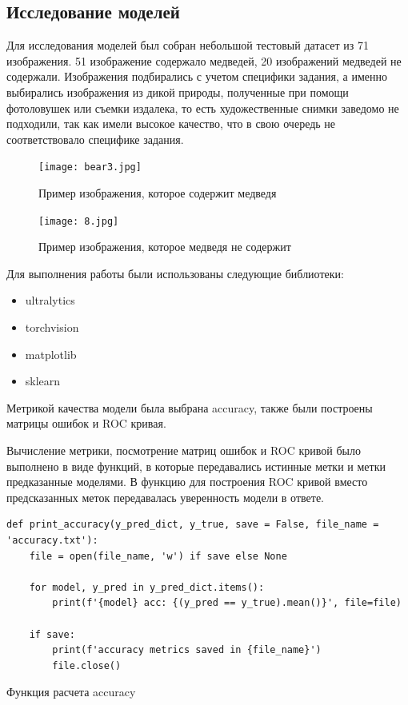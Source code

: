 \documentclass[../document.tex]{subfiles}
\begin{document}
 	\subsection{Исследование моделей}
 		\par Для исследования моделей был собран небольшой тестовый датасет из 71 изображения. 51 изображение содержало медведей, 20 изображений медведей не содержали. Изображения подбирались с учетом специфики задания, а именно выбирались изображения из дикой природы, полученные при помощи фотоловушек или съемки издалека, то есть художественные снимки заведомо не подходили, так как имели высокое качество, что в свою очередь не соответствовало специфике задания.
 		\begin{figure}[H]
 			\centering
 			\texttt{[image: bear3.jpg]}
 			\caption{Пример изображения, которое содержит медведя}
 		\end{figure}
 		\begin{figure}[H]
 			\centering
 			\texttt{[image: 8.jpg]}
 			\caption{Пример изображения, которое медведя не содержит}
 		\end{figure}
 		\par Для выполнения работы были использованы следующие библиотеки:
 		\begin{itemize}
 			\item ultralytics
 			\item torchvision
 			\item matplotlib
 			\item sklearn
 		\end{itemize}
 		\par Метрикой качества модели была выбрана accuracy, также были построены матрицы ошибок и ROC кривая.
 		\par Вычисление метрики, посмотрение матриц ошибок и ROC кривой было выполнено в виде функций, в которые передавались истинные метки и метки предказанные моделями. В функцию для построения ROC кривой вместо предсказанных меток передавалась уверенность модели в ответе.
 		\begin{listing}[H]
 		\begin{verbatim}
def print_accuracy(y_pred_dict, y_true, save = False, file_name = 'accuracy.txt'):
    file = open(file_name, 'w') if save else None
	
    for model, y_pred in y_pred_dict.items():
        print(f'{model} acc: {(y_pred == y_true).mean()}', file=file)
	
	if save:
	    print(f'accuracy metrics saved in {file_name}')
	    file.close()
 		\end{verbatim}
 		\caption{\label{sample1}Функция расчета accuracy}
 		\end{listing}
\end{document}
